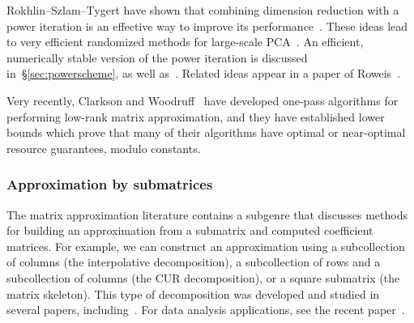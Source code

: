 \documentclass[final]{siamltex}
\newcounter{algorithm}[section]
\begin{document}
Rokhlin--Szlam--Tygert have shown that combining dimension reduction
with a power iteration is an effective way to improve its performance~\cite{tygert_szlam}.
These ideas lead to very efficient randomized methods for large-scale
PCA~\cite{2010_outofcore}.
An efficient, numerically stable version of the power iteration
is discussed in~\S\ref{sec:powerscheme}, as well as~\cite{Szlam10}.
Related ideas appear in a paper of Roweis~\cite{roweis}.

Very recently, Clarkson and Woodruff~\cite{2009_clarkson_woodruff}
have developed one-pass algorithms for performing low-rank matrix
approximation, and they have established lower bounds which prove
that many of their algorithms have optimal or near-optimal resource guarantees, modulo constants.










\subsubsection{Approximation by submatrices}

The matrix approximation literature contains a
subgenre that discusses methods for building an approximation from a
submatrix and computed coefficient matrices. For example, we can
construct an approximation using a subcollection of columns (the
interpolative decomposition), a subcollection of rows and a
subcollection of columns (the CUR decomposition), or a square
submatrix (the matrix skeleton).  This type of decomposition was
developed and studied in several papers,
including~\cite{mskel,GTZ97:Theory-Pseudoskeleton,Ste99:Four-Algorithms}.
For data analysis applications, see the recent paper~\cite{MD09:CUR-Matrix}.
\end{document}

